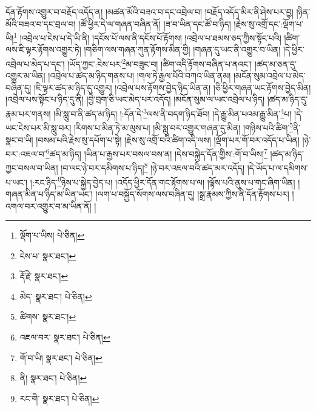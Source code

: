 དོན་རྟོགས་འགྱུར་བ་བརྗོད་འདོད་ན། །མཚན་མོའི་བཟའ་བ་དང་འབྲེལ་བ། །བརྗོད་འདོད་མིར་ནི་ཤེས་པར་བྱ། །ཉིན་མོའི་བཟའ་བ་དང་བྲལ་བ། །ཚོ་ཕྱིར་དེ་ལ་གཞན་བཞིན་ནོ། །ཟ་བ་ཡིན་དང་ཚོ་བ་ཉིད། །རྗེས་སུ་འགྲོ་དང་:ལྡོག་པ་ཡི།\footnote{ལྡོག་པ་ཡིས།  པེ་ཅིན། } །འབྲེལ་པ་ངེས་པ་དེ་ཡི་ནི། །དངོས་པོ་ལས་ནི་དངོས་པོ་རྟོགས། །འབྲེལ་པ་ཐམས་ཅད་ཀྱིས་སྟོང་པའི། །ཚིག་ལས་ཇི་ལྟར་རྟོགས་འགྱུར་ཏེ། །གཅིག་ལས་གཞན་ཀུན་རྟོགས་མིན་གྱི། །གཞན་དུ་ཡང་ནི་འགྱུར་བ་ཡིན། །དེ་ཕྱིར་འབྲེལ་པ་མེད་པ་དང་། །ཡོད་ཀྱང་:ངེས་པར་\footnote{ངེས་པ་  སྣར་ཐང་། }མ་བཟུང་བ། །ཚིག་འདི་རྟོགས་བཞིན་པ་ནའང་། །ཚད་མ་ཅན་དུ་འགྱུར་མ་ཡིན། །འབྲེལ་པ་ཚད་མ་ཉིད་གནས་པ། །གལ་ཏེ་རྒྱལ་པོའི་བཀའ་ཡིན་ནམ། །མངོན་སུམ་འབྲེལ་པ་མེད་བཞིན་དུ། །ཇི་ལྟར་ཚད་མ་ཉིད་དུ་འགྱུར། །འབྲེལ་པས་རྟོགས་བྱེད་ཉིད་ཡིན་ན། །ཅི་ཕྱིར་གཞན་ཡང་རྟོགས་བྱེད་མིན། །འབྲེལ་པས་སྟོང་པ་ཉིད་དུ་ནི། །བྱེ་བྲག་ཅི་ཡང་མེད་པར་འདོད། །མངོན་སུམ་ལ་ཡང་འབྲེལ་པ་ཉིད། །ཚད་མ་ཉིད་དུ་རྣམ་པར་གནས། །མི་སླུ་བ་ནི་ཚད་མ་ཉིད། །:དོན་དེ་\footnote{རྡོ་རྗེ་  སྣར་ཐང་། }ལས་ནི་བདག་ཉིད་ཐོབ། །དེ་རྒྱུ་མིན་པའམ་རྒྱུ་མིན་\footnote{མེད་  སྣར་ཐང་།  པེ་ཅིན། }པ། །དེ་ཡང་ངེས་པར་མི་སླུ་བར། །རིགས་པ་མིན་ཏེ་མ་ལུས་པ། །མི་སླུ་བར་འགྱུར་གཞན་དུ་མིན། །གཉིས་པའི་ཚིག་\footnote{ཚིགས་  སྣར་ཐང་། }ནི་སྣང་བ་ཡི། །བསམ་པའི་རྗེས་སུ་དཔོག་པ་སྟེ། །རྗེས་སུ་འགྲོ་བའི་ཚིག་འདི་ལས། །ལྡོག་པར་གོ་བར་འདོད་པ་ཡིན། །ཉེ་བར་:འཇལ་བ་\footnote{འཇལ་བར་  སྣར་ཐང་།  པེ་ཅིན། }ཚད་མ་ཉིད། །ཡིན་པ་རྒྱས་པར་བསལ་བས་ན། །དེས་བསྐྱེད་དོན་གྱིས་:གོ་བ་ཡིས།\footnote{གོ་བ་ཡི།  སྣར་ཐང་།  པེ་ཅིན། } །ཚད་མ་ཉིད་ཀྱང་བསལ་བ་ཡིན། །བ་ལང་ཉེ་བར་དམིགས་པ་ཉིད།\footnote{ནི།  སྣར་ཐང་།  པེ་ཅིན། } །ཉེ་བར་འཇལ་བའི་ཚད་མར་འདོད། །དེ་ཡོད་པ་ལ་དམིགས་པ་ཡང་། །:རང་ཉིད་\footnote{རང་གི་  སྣར་ཐང་།  པེ་ཅིན། }ཉེས་པ་སྐྱེད་བྱེད་པ། །འདོད་ཕྱིར་དོན་གང་རྟོགས་པ་ལ། །ལྟོས་པའི་ནུས་པ་གང་ཞིག་ཡིན། །གཞན་མིན་པ་ཉིད་མ་ཡིན་ཡང་། །ལག་པ་བསྐྱོད་སོགས་ལས་བཞིན་དུ། །སྒྲ་རྣམས་ཀྱིས་ནི་དོན་རྟོགས་པར། །འགལ་བར་འགྱུར་བ་མ་ཡིན་ནོ། །
